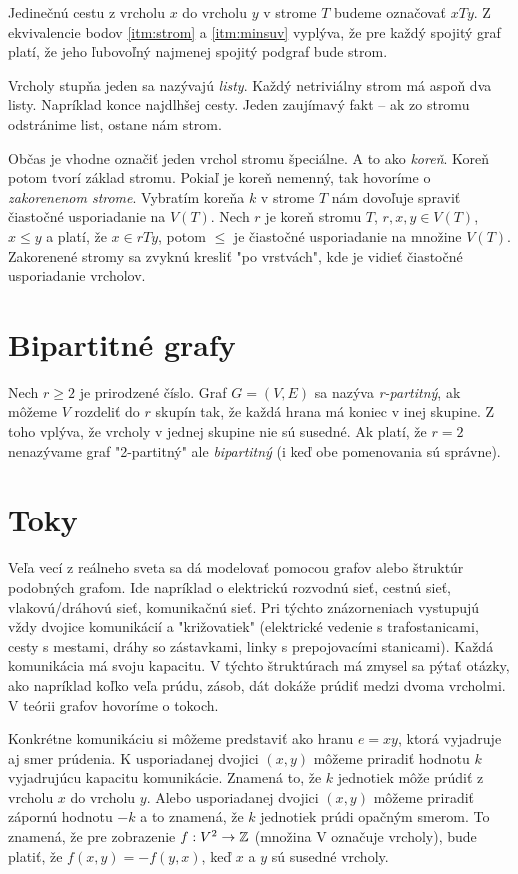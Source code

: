 Jedinečnú cestu z vrcholu $x$ do vrcholu $y$ v strome $T$ budeme označovať 
$xTy$. Z ekvivalencie bodov \ref{itm:strom} a \ref{itm:minsuv} vyplýva, 
že pre každý spojitý graf platí, že jeho ľubovoľný najmenej spojitý podgraf 
bude strom.

Vrcholy stupňa jeden sa nazývajú \emph{listy}. Každý netriviálny strom má aspoň 
dva listy. Napríklad konce najdlhšej cesty. Jeden zaujímavý fakt -- ak zo 
stromu odstránime list, ostane nám strom.

Občas je vhodne označiť jeden vrchol stromu špeciálne. A to ako \emph{koreň}. 
Koreň potom tvorí základ stromu. Pokiaľ je koreň nemenný, tak hovoríme 
o \emph{zakorenenom strome}. Vybratím koreňa $k$ v strome $T$ nám dovoľuje 
spraviť čiastočné usporiadanie na $V(T)$. Nech $r$ je koreň stromu $T$, 
$r, x, y \in V(T)$, $x \leq y$ a platí, že $x \in rTy$, potom $\leq$ je 
čiastočné usporiadanie na množine $V(T)$. Zakorenené stromy sa zvyknú kresliť 
"po vrstvách", kde je vidieť čiastočné usporiadanie vrcholov.


\section{Bipartitné grafy}

Nech $r \geq 2$ je prirodzené číslo. Graf $G = (V, E)$ sa nazýva 
\emph{r-partitný}, ak môžeme $V$ rozdeliť do $r$ skupín tak, že každá hrana 
má koniec v inej skupine. Z toho vplýva, že vrcholy v jednej skupine nie sú 
susedné. Ak platí, že  $r = 2$ nenazývame graf "2-partitný" ale 
\emph{bipartitný} (i keď obe pomenovania sú správne).

\section{Toky}

Veľa vecí z reálneho sveta sa dá modelovať pomocou grafov alebo štruktúr 
podobných grafom. Ide napríklad o elektrickú rozvodnú sieť, cestnú sieť, 
vlakovú/dráhovú sieť, komunikačnú sieť. Pri týchto znázorneniach vystupujú 
vždy dvojice komunikácií a "križovatiek" (elektrické vedenie s trafostanicami, 
cesty s mestami, dráhy so zástavkami, linky s prepojovacími stanicami). Každá 
komunikácia má svoju kapacitu. V týchto štruktúrach má zmysel sa pýtať otázky, 
ako napríklad koľko veľa prúdu, zásob, dát dokáže prúdiť medzi dvoma vrcholmi. 
V teórii grafov hovoríme o tokoch. 

Konkrétne komunikáciu si môžeme predstaviť ako hranu $e = xy$, ktorá vyjadruje 
aj smer prúdenia. K usporiadanej dvojici $(x, y)$ môžeme priradiť hodnotu $k$ 
vyjadrujúcu kapacitu komunikácie. Znamená to, že $k$ jednotiek môže prúdiť z 
vrcholu $x$ do vrcholu $y$. Alebo usporiadanej dvojici $(x, y)$ môžeme priradiť
zápornú hodnotu $-k$ a to znamená, že $k$ jednotiek prúdi opačným smerom. To 
znamená, že pre zobrazenie $f:V^2\rightarrow\mathbb{Z}$ (množina V označuje vrcholy), 
bude platiť, že $f(x,y) = -f(y,x)$, keď $x$ a $y$ sú susedné vrcholy.


